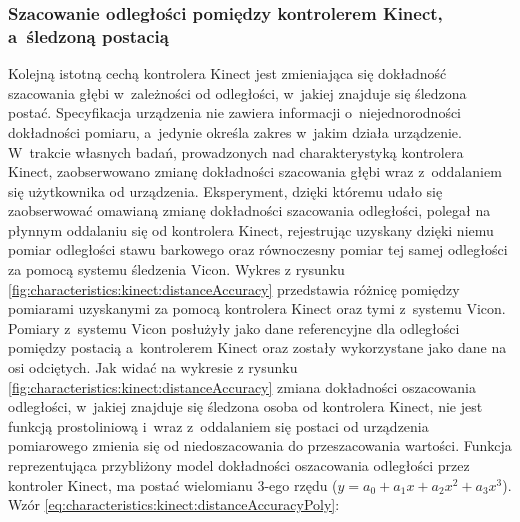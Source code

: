 																																					
\subsubsection*{Szacowanie odległości pomiędzy kontrolerem Kinect, a~śledzoną postacią}\label{sssection:distanceEstimation}
Kolejną istotną cechą kontrolera Kinect jest zmieniająca się dokładność szacowania głębi w~zależności od odległości, w~jakiej znajduje się śledzona postać. Specyfikacja urządzenia nie zawiera informacji o~niejednorodności dokładności pomiaru, a~jedynie określa zakres w~jakim działa urządzenie. W~trakcie własnych badań, prowadzonych nad charakterystyką kontrolera Kinect, zaobserwowano zmianę dokładności szacowania głębi wraz z~oddalaniem się użytkownika od urządzenia. Eksperyment, dzięki któremu udało się zaobserwować omawianą zmianę dokładności szacowania odległości, polegał na płynnym oddalaniu się od kontrolera Kinect, rejestrując uzyskany dzięki niemu pomiar odległości stawu barkowego oraz równoczesny pomiar tej samej odległości za pomocą systemu śledzenia Vicon. Wykres z rysunku \ref{fig:characteristics:kinect:distanceAccuracy} przedstawia różnicę pomiędzy pomiarami uzyskanymi za pomocą kontrolera Kinect oraz tymi z~systemu Vicon. Pomiary z~systemu Vicon posłużyły jako dane referencyjne dla odległości pomiędzy postacią a~kontrolerem Kinect oraz zostały wykorzystane jako dane na osi odciętych. Jak widać na wykresie z rysunku \ref{fig:characteristics:kinect:distanceAccuracy} zmiana dokładności oszacowania odległości, w~jakiej znajduje się śledzona osoba od kontrolera Kinect, nie jest funkcją prostoliniową i~wraz z~oddalaniem się postaci od urządzenia pomiarowego zmienia się od niedoszacowania do przeszacowania wartości. Funkcja reprezentująca przybliżony model dokładności oszacowania odległości przez kontroler Kinect, ma postać wielomianu 3-ego rzędu ($y = a_0 + a_1x + a_2x^2 + a_3x^3$). Wzór \ref{eq:characteristics:kinect:distanceAccuracyPoly}: 
																																							
